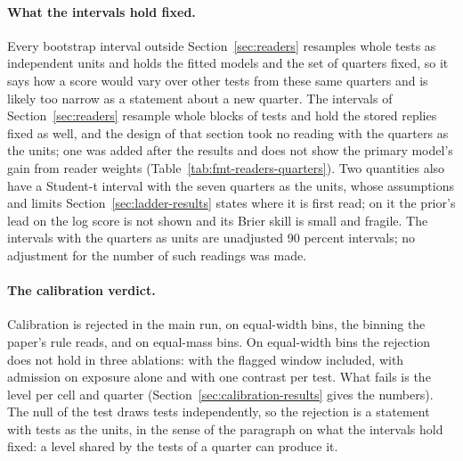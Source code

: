 \paragraph{What the intervals hold fixed.} Every bootstrap interval outside Section~\ref{sec:readers} resamples whole tests as independent units and holds the fitted models and the set of quarters fixed, so it says how a score would vary over other tests from these same quarters and is likely too narrow as a statement about a new quarter. The intervals of Section~\ref{sec:readers} resample whole blocks of tests and hold the stored replies fixed as well, and the design of that section took no reading with the quarters as the units; one was added after the results and does not show the primary model's gain from reader weights (Table~\ref{tab:fmt-readers-quarters}). Two quantities also have a Student-t interval with the seven quarters as the units, whose assumptions and limits Section~\ref{sec:ladder-results} states where it is first read; on it the prior's lead on the log score is not shown and its Brier skill is small and fragile. The intervals with the quarters as units are unadjusted 90 percent intervals; no adjustment for the number of such readings was made.

\paragraph{The calibration verdict.} Calibration is rejected in the main run, on equal-width bins, the binning the paper's rule reads, and on equal-mass bins. On equal-width bins the rejection does not hold in three ablations: with the flagged window included, with admission on exposure alone and with one contrast per test. What fails is the level per cell and quarter (Section~\ref{sec:calibration-results} gives the numbers). The null of the test draws tests independently, so the rejection is a statement with tests as the units, in the sense of the paragraph on what the intervals hold fixed: a level shared by the tests of a quarter can produce it.

